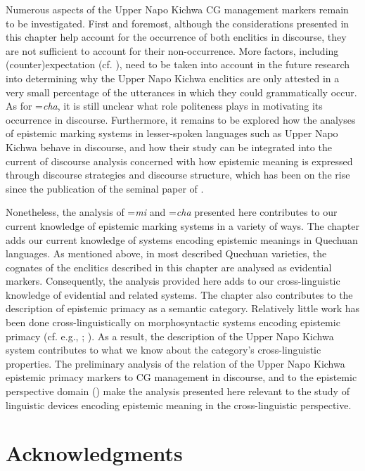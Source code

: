 \documentclass[output=paper]{langscibook}
\begin{document}
Numerous aspects of the Upper Napo Kichwa CG management markers remain to be investigated. First and foremost, although the considerations presented in this chapter help account for the occurrence of both enclitics in discourse, they are not sufficient to account for their non-occurrence. More factors, including (counter)expectation (cf. \citealt{Matic2015}), need to be taken into account in the future research into determining why the Upper Napo Kichwa enclitics are only attested in a very small percentage of the utterances in which they could grammatically occur. As for =\textit{cha}, it is still unclear what role politeness plays in motivating its occurrence in discourse. Furthermore, it remains to be explored how the analyses of epistemic marking systems in lesser-spoken languages such as Upper Napo Kichwa behave in discourse, and how their study can be integrated into the current of discourse analysis concerned with how epistemic meaning is expressed through discourse strategies and discourse structure, which has been on the rise since the publication of the seminal paper of \cite{Heritage2005}.

Nonetheless, the analysis of =\textit{mi} and =\textit{cha} presented here contributes to our current knowledge of epistemic marking systems in a variety of ways. The chapter adds our current knowledge of systems encoding epistemic meanings in Quechuan languages. As mentioned above, in most described Quechuan varieties, the cognates of the enclitics described in this chapter are analysed as evidential markers. Consequently, the analysis provided here adds to our cross-linguistic knowledge of evidential and related systems. The chapter also contributes to the description of epistemic primacy as a semantic category. Relatively little work has been done cross-linguistically on morphosyntactic systems encoding epistemic primacy (cf. e.g., \citealt{Stivers2011}; \citealt{Hayano2011}). As a result, the description of the Upper Napo Kichwa system contributes to what we know about the category’s cross-linguistic properties. The preliminary analysis of the relation of the Upper Napo Kichwa epistemic primacy markers to CG management in discourse, and to the epistemic perspective domain (\citealt{Bergqvist2017}) make the analysis presented here relevant to the study of linguistic devices encoding epistemic meaning in the cross-linguistic perspective.

\section*{Acknowledgments}
\end{document}
